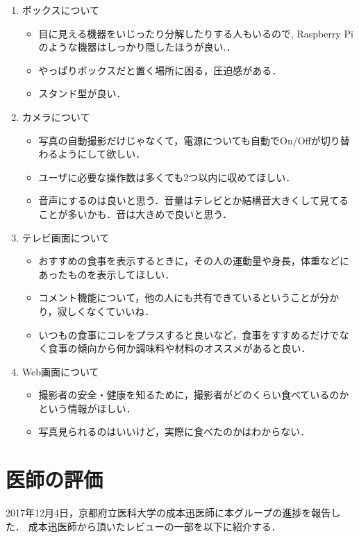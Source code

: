 \documentclass[../report]{subfiles}
\begin{document}
\begin{enumerate}
    \item[] ボックスについて
    \begin{itemize}
        \item 目に見える機器をいじったり分解したりする人もいるので, Raspberry Piのような機器はしっかり隠したほうが良い.．
        \item やっぱりボックスだと置く場所に困る，圧迫感がある．
        \item スタンド型が良い．
    \end{itemize}

    \item[] カメラについて
    \begin{itemize}
        \item 写真の自動撮影だけじゃなくて，電源についても自動でOn/Offが切り替わるようにして欲しい．
        \item ユーザに必要な操作数は多くても2つ以内に収めてほしい．
        \item 音声にするのは良いと思う．音量はテレビとか結構音大きくして見てることが多いかも．音は大きめで良いと思う．
    \end{itemize}

    \item[] テレビ画面について
    \begin{itemize}
        \item おすすめの食事を表示するときに，その人の運動量や身長，体重などにあったものを表示してほしい．
        \item コメント機能について，他の人にも共有できているということが分かり，寂しくなくていいね．
        \item いつもの食事にコレをプラスすると良いなど，食事をすすめるだけでなく食事の傾向から何か調味料や材料のオススメがあると良い．
    \end{itemize}

    \item[] Web画面について
    \begin{itemize}
        \item 撮影者の安全・健康を知るために，撮影者がどのくらい食べているのかという情報がほしい．
        \item 写真見られるのはいいけど，実際に食べたのかはわからない．
    \end{itemize}
\end{enumerate}

\section{医師の評価}
2017年12月4日，京都府立医科大学の成本迅医師に本グループの進捗を報告した．
成本迅医師から頂いたレビューの一部を以下に紹介する．
\end{document}
